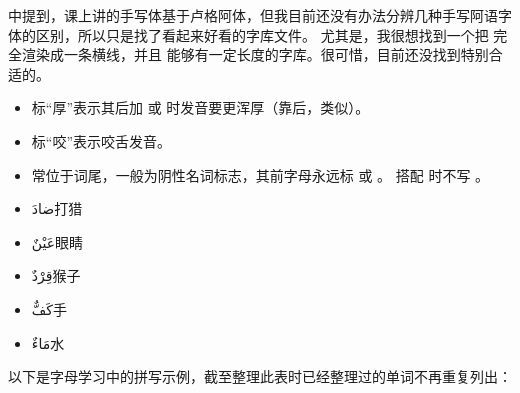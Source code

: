 \begin{note}
     中提到，课上讲的手写体基于卢格阿体，但我目前还没有办法分辨几种手写阿语字体的区别，所以只是找了看起来好看的字库文件。
    尤其是，我很想找到一个把  完全渲染成一条横线，并且  能够有一定长度的字库。很可惜，目前还没找到特别合适的。
\end{note}

\begin{itemize}
    \item 标``厚''表示其后加  或  时发音要更浑厚（靠后，类似\textipa{[A]}）。
    \item 标``咬''表示咬舌发音。
    \item {} 常位于词尾，一般为阴性名词标志，其前字母永远标  或  。 搭配  时不写 。
    \item \ac{ضادَ}{打猎}
    \item \ac{عَيْنٌ}{眼睛} 
    \item \ac{قِرْدٌ}{猴子}
    \item \ac{كَفٌّ}{手}
    \item \ac{مَاءٌ}{水}
\end{itemize}

以下是字母学习中的拼写示例，截至整理此表时已经整理过的单词不再重复列出：

